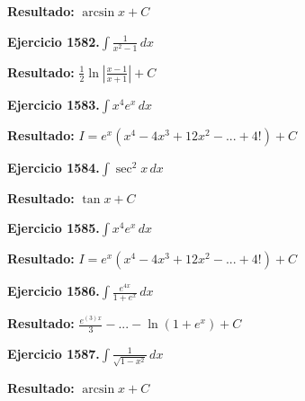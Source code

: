 \documentclass[10pt,a4paper]{article}
\begin{document}
\begin{solbox}
\textbf{Resultado:} \(\displaystyle \arcsin x + C\)
\end{solbox}

\newpage
\begin{ejbox}
\textbf{Ejercicio 1582.}\quad $\int \frac{1}{x^2-1}\,dx$
\end{ejbox}

\begin{solbox}
\textbf{Resultado:} \(\displaystyle \frac{1}{2}\ln\left|\frac{x-1}{x+1}\right| + C\)
\end{solbox}

\begin{ejbox}
\textbf{Ejercicio 1583.}\quad $\int x^{4} e^x\,dx$
\end{ejbox}

\begin{solbox}
\textbf{Resultado:} \(\displaystyle I = e^x(x^{4} - 4x^{3} + 12x^{2} - ... + 4!) + C\)
\end{solbox}

\begin{ejbox}
\textbf{Ejercicio 1584.}\quad $\int \sec^2 x\,dx$
\end{ejbox}

\begin{solbox}
\textbf{Resultado:} \(\displaystyle \tan x + C\)
\end{solbox}

\newpage
\begin{ejbox}
\textbf{Ejercicio 1585.}\quad $\int x^{4} e^x\,dx$
\end{ejbox}

\begin{solbox}
\textbf{Resultado:} \(\displaystyle I = e^x(x^{4} - 4x^{3} + 12x^{2} - ... + 4!) + C\)
\end{solbox}

\begin{ejbox}
\textbf{Ejercicio 1586.}\quad $\int \frac{e^{4x}}{1+e^{x}}\,dx$
\end{ejbox}

\begin{solbox}
\textbf{Resultado:} \(\displaystyle \frac{e^{(3)x}}{3} - ... - \ln(1+e^x) + C\)
\end{solbox}

\begin{ejbox}
\textbf{Ejercicio 1587.}\quad $\int \frac{1}{\sqrt{1-x^2}}\,dx$
\end{ejbox}

\begin{solbox}
\textbf{Resultado:} \(\displaystyle \arcsin x + C\)
\end{solbox}
\end{document}
